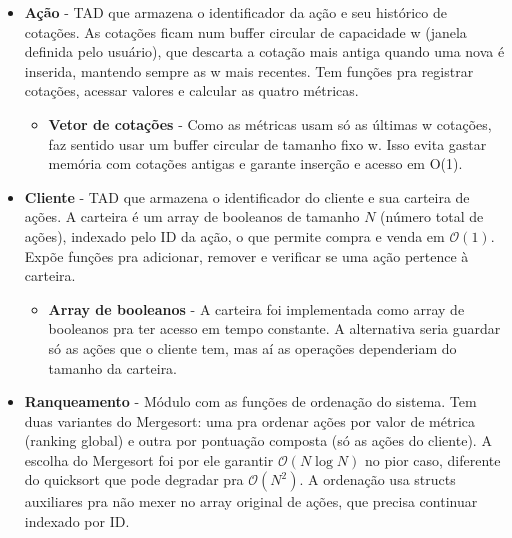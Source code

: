 \documentclass[12pt,a4paper]{article}
\begin{document}
\begin{itemize}
\item \textbf{Ação} - TAD que armazena o identificador da ação e seu histórico de cotações. As cotações ficam num buffer circular de capacidade w (janela definida pelo usuário), que descarta a cotação mais antiga quando uma nova é inserida, mantendo sempre as w mais recentes. Tem funções pra registrar cotações, acessar valores e calcular as quatro métricas.
\begin{itemize}
\item \textbf{Vetor de cotações} - Como as métricas usam só as últimas w cotações, faz sentido usar um buffer circular de tamanho fixo w. Isso evita gastar memória com cotações antigas e garante inserção e acesso em O(1).
\end{itemize}

\item \textbf{Cliente} - TAD que armazena o identificador do cliente e sua carteira de ações. A carteira é um array de booleanos de tamanho $N$ (número total de ações), indexado pelo ID da ação, o que permite compra e venda em $\mathcal{O}(1)$. Expõe funções pra adicionar, remover e verificar se uma ação pertence à carteira.
\begin{itemize}
    \item \textbf{Array de booleanos} - A carteira foi implementada como array de booleanos pra ter acesso em tempo constante. A alternativa seria guardar só as ações que o cliente tem, mas aí as operações dependeriam do tamanho da carteira.
\end{itemize}

\item \textbf{Ranqueamento} - Módulo com as funções de ordenação do sistema. Tem duas variantes do Mergesort: uma pra ordenar ações por valor de métrica (ranking global) e outra por pontuação composta (só as ações do cliente). A escolha do Mergesort foi por ele garantir $\mathcal{O}(N \log N)$ no pior caso, diferente do quicksort que pode degradar pra $\mathcal{O}(N^2)$. A ordenação usa structs auxiliares pra não mexer no array original de ações, que precisa continuar indexado por ID.


\end{itemize}
\end{document}
